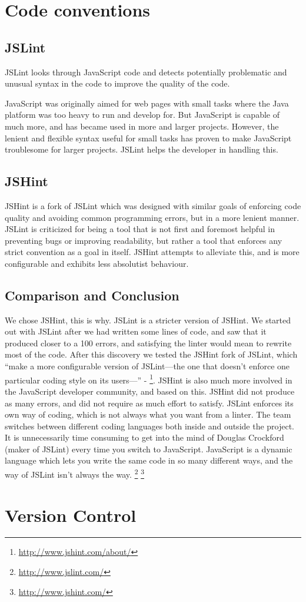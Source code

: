 \section{Code conventions}
\subsection*{JSLint}
JSLint looks through JavaScript code and detects potentially problematic and unusual syntax in the code to improve the quality of the code. 

JavaScript was originally aimed for web pages with small tasks where the Java platform was too heavy to run and develop for. But JavaScript is capable of much more, and has became used in more and larger projects. However, the lenient and flexible syntax useful for small tasks has proven to make JavaScript troublesome for larger projects. JSLint helps the developer in handling this. \cite{jslint-about}

\subsection*{JSHint}
JSHint is a fork of JSLint which was designed with similar goals of enforcing code quality and avoiding common programming errors, but in a more lenient manner. JSLint is criticized for being a tool that is not first and foremost helpful in preventing bugs or improving readability, but rather a tool that enforces any strict convention as a goal in itself. JSHint attempts to alleviate this, and is more configurable and exhibits less absolutist behaviour. \cite{jshint-about}

\subsection*{Comparison and Conclusion}
We chose JSHint, this is why.
JSLint is a stricter version of JSHint. We started out with JSLint after we had written some lines of code, and saw that it produced closer to a 100 errors, and satisfying the linter would mean to rewrite most of the code. After this discovery we tested the JSHint fork of JSLint, which  “make a more configurable version of JSLint—the one that doesn't enforce one particular coding style on its users—” - \footnote{\url{http://www.jshint.com/about/}}. JSHint is also much more involved in the JavaScript developer community, and based on this. JSHint did not produce as many errors, and did not require as much effort to satisfy.
JSLint enforces its own way of coding, which is not always what you want from a linter. The team switches between different coding languages both inside and outside the project. It is unnecessarily time consuming to get into the mind of Douglas Crockford (maker of JSLint) every time you switch to JavaScript. JavaScript is a dynamic language which lets you write the same code in so many different ways, and the way of JSLint isn’t always the way.
\footnote{\url{http://www.jslint.com/}}
\footnote{\url{http://www.jshint.com/}}

\section{Version Control}

